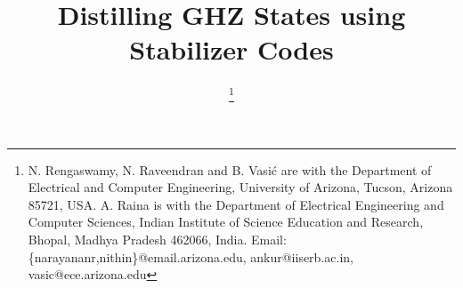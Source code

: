 \documentclass[journal,onecolumn]{IEEEtran}
\begin{document}
\title{Distilling GHZ States using Stabilizer Codes}

\author{%
   \thanks{%
           N. Rengaswamy, N. Raveendran and B. Vasi{\'c} are with the 
           Department of Electrical and Computer Engineering,
           University of Arizona, Tucson, Arizona 85721, USA.
           A. Raina is with the Department of Electrical Engineering and Computer Sciences, Indian Institute of Science Education and Research, Bhopal, Madhya Pradesh 462066, India.
           Email: \{narayananr,nithin\}@email.arizona.edu, ankur@iiserb.ac.in, vasic@ece.arizona.edu}%
}


\maketitle


\end{document}
